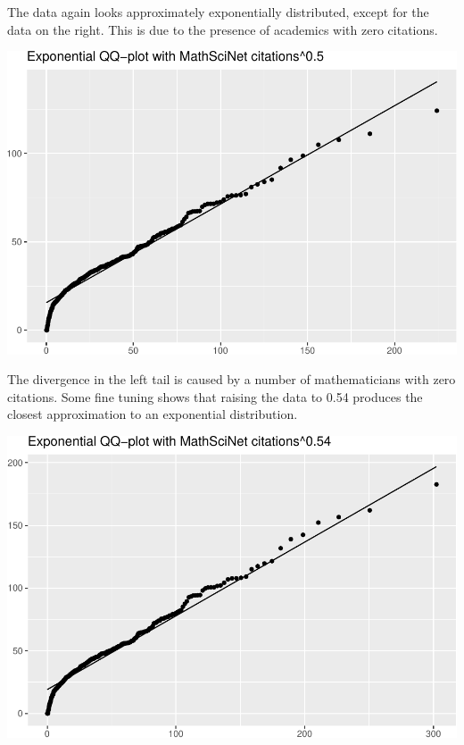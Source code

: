 \documentclass[]{article}
\begin{document}
The data again looks approximately exponentially distributed, except for
the data on the right. This is due to the presence of academics with
zero citations.

\includegraphics{final_files/figure-latex/unnamed-chunk-14-1.pdf}

The divergence in the left tail is caused by a number of mathematicians
with zero citations. Some fine tuning shows that raising the data to
0.54 produces the closest approximation to an exponential distribution.

\includegraphics{final_files/figure-latex/unnamed-chunk-15-1.pdf}
\end{document}
